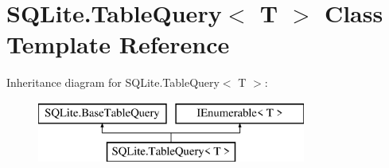 \hypertarget{classSQLite_1_1TableQuery}{}\section{S\+Q\+Lite.\+Table\+Query$<$ T $>$ Class Template Reference}
\label{classSQLite_1_1TableQuery}
Inheritance diagram for S\+Q\+Lite.\+Table\+Query$<$ T $>$\+:\begin{figure}[H]
\begin{center}
\leavevmode
\includegraphics[height=2.000000cm]{classSQLite_1_1TableQuery}
\end{center}
\end{figure}
